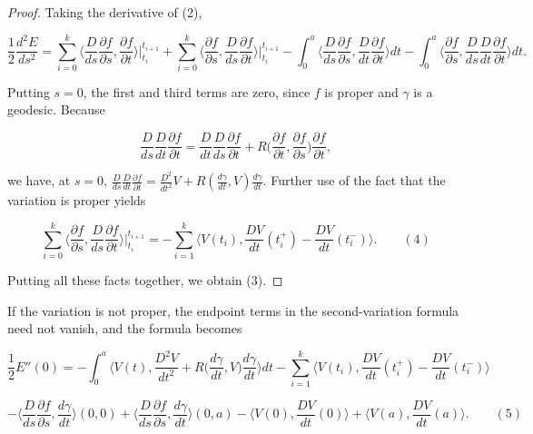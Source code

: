 \begin{proof}
  \sketch
  Taking the derivative of (2),

  $$
  \frac{1}{2}\frac{d^2 E}{ds^2}=\sum_{i=0}^k\Big\langle\frac{D}{ds}\frac{\partial f}{\partial s},\frac{\partial f}{\partial t}\Big\rangle\Big|_{t_i}^{t_{i+1}}+\sum_{i=0}^k\Big\langle\frac{\partial f}{\partial s},\frac{D}{ds}\frac{\partial f}{\partial t}\Big\rangle\Big|_{t_i}^{t_{i+1}}-\int_0^a\Big\langle\frac{D}{ds}\frac{\partial f}{\partial s},\frac{D}{dt}\frac{\partial f}{\partial t}\Big\rangle dt-\int_0^a\Big\langle\frac{\partial f}{\partial s},\frac{D}{ds}\frac{D}{dt}\frac{\partial f}{\partial t}\Big\rangle dt.
  $$

  Putting $s=0$, the first and third terms are zero, since $f$ is proper and
  $\gamma$ is a geodesic. Because

  $$
  \frac{D}{ds}\frac{D}{dt}\frac{\partial f}{\partial t}=\frac{D}{dt}\frac{D}{ds}\frac{\partial f}{\partial t}+R\Big(\frac{\partial f}{\partial t},\frac{\partial f}{\partial s}\Big)\frac{\partial f}{\partial t},
  $$

  we have, at $s=0$,
  $\frac{D}{ds}\frac{D}{dt}\frac{\partial f}{\partial t}=\frac{D^2}{dt^2}V+R(\frac{d\gamma}{dt},V)\frac{d\gamma}{dt}$.
  Further use of the fact that the variation is proper yields

  $$
  \sum_{i=0}^k\Big\langle\frac{\partial f}{\partial s},\frac{D}{ds}\frac{\partial f}{\partial t}\Big\rangle\Big|_{t_i}^{t_{i+1}}=-\sum_{i=1}^k\Big\langle V(t_i),\frac{DV}{dt}(t_i^+)-\frac{DV}{dt}(t_i^-)\Big\rangle.\qquad(4)
  $$

  Putting all these facts together, we obtain (3).
\end{proof}
\begin{remark}
  \label{rem:dc-ch9-2-9}

  If the variation is not proper, the endpoint terms in the second-variation
  formula need not vanish, and the formula becomes

  $$
  \frac{1}{2}E''(0)=-\int_0^a\Big\langle V(t),\frac{D^2 V}{dt^2}+R\Big(\frac{d\gamma}{dt},V\Big)\frac{d\gamma}{dt}\Big\rangle dt-\sum_{i=1}^k\Big\langle V(t_i),\frac{DV}{dt}(t_i^+)-\frac{DV}{dt}(t_i^-)\Big\rangle
  $$

  $$
  -\Big\langle\frac{D}{ds}\frac{\partial f}{\partial s},\frac{d\gamma}{dt}\Big\rangle(0,0)+\Big\langle\frac{D}{ds}\frac{\partial f}{\partial s},\frac{d\gamma}{dt}\Big\rangle(0,a)-\Big\langle V(0),\frac{DV}{dt}(0)\Big\rangle+\Big\langle V(a),\frac{DV}{dt}(a)\Big\rangle.\qquad(5)
  $$
\end{remark}
